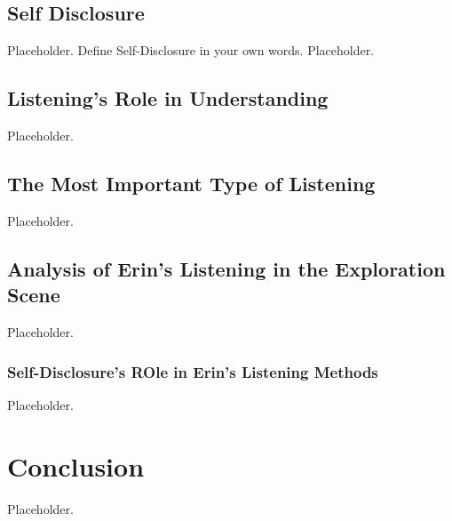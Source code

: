 \documentclass[stu,12pt]{apa7}
\begin{document}
    \subsection{Self Disclosure}
      Placeholder. Define Self-Disclosure in your own words. Placeholder.

    \subsection{Listening's Role in Understanding}
      Placeholder.

    \subsection{The Most Important Type of Listening}
      Placeholder.

    \subsection{Analysis of Erin's Listening in the Exploration Scene}
      Placeholder.

      \subsubsection{Self-Disclosure's ROle in Erin's Listening Methods}
      Placeholder.


  \section{Conclusion}
    Placeholder.


  \newpage
  \printbibliography[%
    title={References},%
    heading={bibintoc},%
    notcategory={consulted}%
  ]


  \newpage
  \nocite{*}
  \printbibliography[%
    title={Additional References},%
    heading={bibintoc},%
    category={consulted}%
  ]
\end{document}
